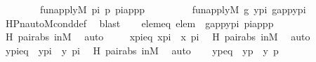\begin{isabellebody}
\ \ \ \ \ \ \ \ {\isachardoublequoteopen}fun{\isacharunderscore}{\kern0pt}apply{\isacharparenleft}{\kern0pt}{\isacharhash}{\kern0pt}{\isacharhash}{\kern0pt}M{\isacharcomma}{\kern0pt}\ pi{\isacharcomma}{\kern0pt}\ p{\isacharcomma}{\kern0pt}\ pi{\isacharunderscore}{\kern0pt}app{\isacharunderscore}{\kern0pt}p{\isacharparenright}{\kern0pt}{\isachardoublequoteclose}\ \isanewline
\ \ \ \ \ \ \ \ {\isachardoublequoteopen}fun{\isacharunderscore}{\kern0pt}apply{\isacharparenleft}{\kern0pt}{\isacharhash}{\kern0pt}{\isacharhash}{\kern0pt}M{\isacharcomma}{\kern0pt}\ g{\isacharcomma}{\kern0pt}\ y{\isacharunderscore}{\kern0pt}pi{\isacharcomma}{\kern0pt}\ g{\isacharunderscore}{\kern0pt}app{\isacharunderscore}{\kern0pt}y{\isacharunderscore}{\kern0pt}pi{\isacharparenright}{\kern0pt}{\isachardoublequoteclose}\isanewline
\ \ \ \ \isamarkupfalse%
\ HPn{\isacharunderscore}{\kern0pt}auto{\isacharunderscore}{\kern0pt}M{\isacharunderscore}{\kern0pt}cond{\isacharunderscore}{\kern0pt}def\ \isamarkupfalse%
\ blast\isanewline
\ \ \isamarkupfalse%
\ elemeq{\isacharcolon}{\kern0pt}\ {\isachardoublequoteopen}elem\ {\isacharequal}{\kern0pt}\ {\isacharless}{\kern0pt}g{\isacharunderscore}{\kern0pt}app{\isacharunderscore}{\kern0pt}y{\isacharunderscore}{\kern0pt}pi{\isacharcomma}{\kern0pt}\ pi{\isacharunderscore}{\kern0pt}app{\isacharunderscore}{\kern0pt}p{\isachargreater}{\kern0pt}{\isachardoublequoteclose}\ \isamarkupfalse%
\ H\ pair{\isacharunderscore}{\kern0pt}abs\ inM\ \isamarkupfalse%
\ auto\ \isanewline
\ \ \isamarkupfalse%
\ x{\isacharunderscore}{\kern0pt}pi{\isacharunderscore}{\kern0pt}eq\ {\isacharcolon}{\kern0pt}{\isachardoublequoteopen}x{\isacharunderscore}{\kern0pt}pi\ {\isacharequal}{\kern0pt}\ {\isacharless}{\kern0pt}x{\isacharcomma}{\kern0pt}\ pi{\isachargreater}{\kern0pt}{\isachardoublequoteclose}\ \isamarkupfalse%
\ H\ pair{\isacharunderscore}{\kern0pt}abs\ inM\ \isamarkupfalse%
\ auto\isanewline
\ \ \isamarkupfalse%
\ y{\isacharunderscore}{\kern0pt}pi{\isacharunderscore}{\kern0pt}eq\ {\isacharcolon}{\kern0pt}\ {\isachardoublequoteopen}y{\isacharunderscore}{\kern0pt}pi\ {\isacharequal}{\kern0pt}\ {\isacharless}{\kern0pt}y{\isacharcomma}{\kern0pt}\ pi{\isachargreater}{\kern0pt}{\isachardoublequoteclose}\ \isamarkupfalse%
\ H\ pair{\isacharunderscore}{\kern0pt}abs\ inM\ \isamarkupfalse%
\ auto\isanewline
\ \ \isamarkupfalse%
\ y{\isacharunderscore}{\kern0pt}p{\isacharunderscore}{\kern0pt}eq\ {\isacharcolon}{\kern0pt}\ {\isachardoublequoteopen}y{\isacharunderscore}{\kern0pt}p\ {\isacharequal}{\kern0pt}\ {\isacharless}{\kern0pt}y{\isacharcomma}{\kern0pt}\ p{\isachargreater}{\kern0pt}{\isachardoublequoteclose}\ \isamarkupfalse%

\end{isabellebody}
